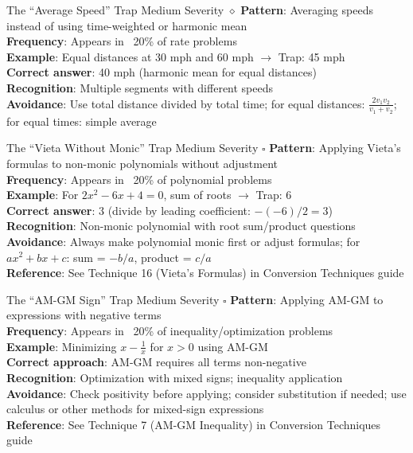 \documentclass{article}
\begin{document}
\begin{trapbox}{The ``Average Speed'' Trap \colorbox{orange!20}{Medium Severity} $\diamond$}
\textbf{Pattern}: Averaging speeds instead of using time-weighted or harmonic mean\\
\textbf{Frequency}: Appears in ~20\% of rate problems\\
\textbf{Example}: Equal distances at 30 mph and 60 mph $\rightarrow$ Trap: 45 mph\\
\textbf{Correct answer}: 40 mph (harmonic mean for equal distances)\\
\textbf{Recognition}: Multiple segments with different speeds\\
\textbf{Avoidance}: Use total distance divided by total time; for equal distances: $\frac{2v_1v_2}{v_1+v_2}$; for equal times: simple average
\end{trapbox}

\begin{trapbox}{The ``Vieta Without Monic'' Trap \colorbox{orange!20}{Medium Severity} $\square$}
\textbf{Pattern}: Applying Vieta's formulas to non-monic polynomials without adjustment\\
\textbf{Frequency}: Appears in ~20\% of polynomial problems\\
\textbf{Example}: For $2x^2 - 6x + 4 = 0$, sum of roots $\rightarrow$ Trap: 6\\
\textbf{Correct answer}: $3$ (divide by leading coefficient: $-(-6)/2 = 3$)\\
\textbf{Recognition}: Non-monic polynomial with root sum/product questions\\
\textbf{Avoidance}: Always make polynomial monic first or adjust formulas; for $ax^2+bx+c$: sum = $-b/a$, product = $c/a$\\
\textbf{Reference}: See Technique 16 (Vieta's Formulas) in Conversion Techniques guide
\end{trapbox}

\begin{trapbox}{The ``AM-GM Sign'' Trap \colorbox{orange!20}{Medium Severity} $\square$}
\textbf{Pattern}: Applying AM-GM to expressions with negative terms\\
\textbf{Frequency}: Appears in ~20\% of inequality/optimization problems\\
\textbf{Example}: Minimizing $x - \frac{1}{x}$ for $x > 0$ using AM-GM\\
\textbf{Correct approach}: AM-GM requires all terms non-negative\\
\textbf{Recognition}: Optimization with mixed signs; inequality application\\
\textbf{Avoidance}: Check positivity before applying; consider substitution if needed; use calculus or other methods for mixed-sign expressions\\
\textbf{Reference}: See Technique 7 (AM-GM Inequality) in Conversion Techniques guide
\end{trapbox}
\end{document}
